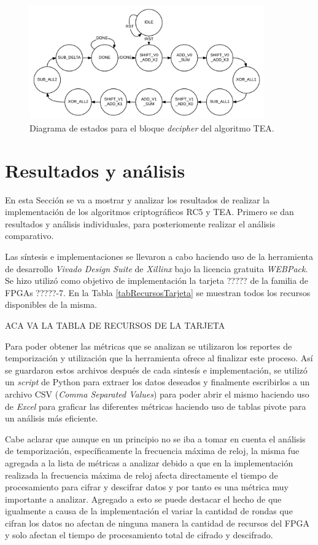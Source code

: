 \begin{figure}
	\centering
	\includegraphics[width=0.9\textwidth]{./images/figDecipherTeaFSM}
	\caption{Diagrama de estados para el bloque \textit{decipher} del algoritmo TEA.}
	\label{figDecipherTeaFSM}
\end{figure}





\chapter{Resultados y análisis}
En esta Sección se va a mostrar y analizar los resultados de realizar la implementación de los algoritmos criptográficos RC5 y TEA.
Primero se dan resultados y análisis individuales, para posteriomente realizar el análisis comparativo.

Las síntesis e implementaciones se llevaron a cabo haciendo uso de la herramienta de desarrollo \textit{Vivado Design Suite} de \textit{Xillinx} bajo la licencia gratuita \textit{WEBPack}. Se hizo utilizó como objetivo de implementación la tarjeta  ????? de la familia de FPGAs ?????-7. En la Tabla \ref{tabRecursosTarjeta} se muestran todos los recursos disponibles de la misma. 


	ACA VA LA TABLA DE RECURSOS DE LA TARJETA

Para poder obtener las métricas que se analizan se utilizaron los reportes de temporización y utilización que la herramienta ofrece al finalizar este proceso. Así se guardaron estos archivos después de cada sintesís e implementación, se utilizó un \textit{script} de Python para extraer los datos deseados y finalmente escribirlos a un archivo CSV (\textit{Comma Separated Values}) para poder abrir el mismo haciendo uso de \textit{Excel} para graficar las diferentes métricas haciendo uso de tablas pivote para un análisis más eficiente.


Cabe aclarar que aunque en un principio no se iba a tomar en cuenta el análisis de temporización, específicamente la frecuencia máxima de reloj, la misma fue agregada a la lista de métricas a analizar debido a que en la implementación realizada la frecuencia máxima de reloj afecta directamente el tiempo de procesamiento para cifrar y descifrar datos y por tanto es una métrica muy importante a analizar. Agregado a esto se puede destacar el hecho de que igualmente a causa de la implementación el variar la cantidad de rondas que cifran los datos no afectan de ninguna manera la cantidad de recursos del FPGA y solo afectan el tiempo de procesamiento total de cifrado y descifrado.


